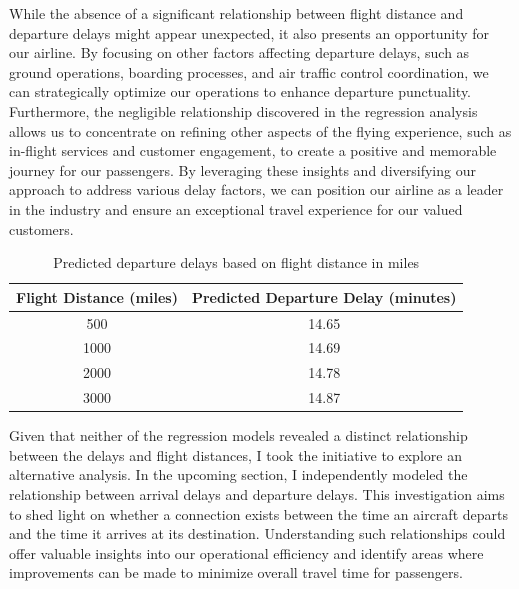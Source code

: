 \documentclass[11pt]{article}
\begin{document}
While the absence of a significant relationship between flight distance and departure delays might appear unexpected, it also presents an opportunity for our airline. By focusing on other factors affecting departure delays, such as ground operations, boarding processes, and air traffic control coordination, we can strategically optimize our operations to enhance departure punctuality. Furthermore, the negligible relationship discovered in the regression analysis allows us to concentrate on refining other aspects of the flying experience, such as in-flight services and customer engagement, to create a positive and memorable journey for our passengers. By leveraging these insights and diversifying our approach to address various delay factors, we can position our airline as a leader in the industry and ensure an exceptional travel experience for our valued customers.

\begin{table}[!h]
    \centering
    \begin{tabular}{|c|c|}
            \hline
            Flight Distance (miles) &  Predicted Departure Delay (minutes) \\
            \hline
            500   &   14.65 \\
            \hline
            1000     &   14.69  \\
            \hline
            2000     &   14.78  \\
            \hline
            3000     &   14.87  \\
            \hline
    \end{tabular}
    \caption{\centering Predicted departure delays based on flight distance in miles}
    \label{tab:lr-2-eval}
\end{table}

Given that neither of the regression models revealed a distinct relationship between the delays and flight distances, I took the initiative to explore an alternative analysis. In the upcoming section, I independently modeled the relationship between arrival delays and departure delays. This investigation aims to shed light on whether a connection exists between the time an aircraft departs and the time it arrives at its destination. Understanding such relationships could offer valuable insights into our operational efficiency and identify areas where improvements can be made to minimize overall travel time for passengers.
\end{document}
